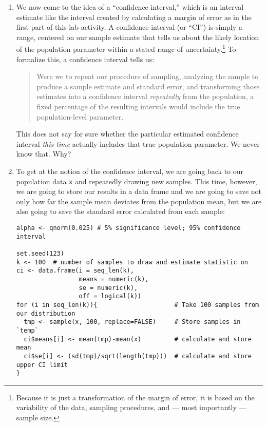\documentclass[a4paper,12pt]{article}
\begin{document}
\begin{enumerate}
\item We now come to the idea of a ``confidence interval,'' which is an interval estimate like the interval created by calculating a margin of error as in the first part of this lab activity. A confidence interval (or ``CI'') is simply a range, centered on our sample estimate that tells us about the likely location of the population parameter within a stated range of uncertainty.\footnote{Because it is just a transformation of the margin of error, it is based on the variability of the data, sampling procedures, and --- most importantly --- sample size.} To formalize this, a confidence interval tells us:

\begin{quote}
Were we to repeat our procedure of sampling, analyzing the sample to produce a sample estimate and standard error, and transforming those estimates into a confidence interval \textit{repeatedly} from the population, a fixed percentage of the resulting intervals would include the true population-level parameter.
\end{quote}
        
\noindent This does not say for sure whether the particular estimated confidence interval \textit{this time} actually includes that true population parameter. We never know that. Why?

\vspace{4em}

\item To get at the notion of the confidence interval, we are going back to our population data \texttt{x} and repeatedly drawing new samples. This time, however, we are going to store our results in a data frame and we are going to save not only how far the sample mean deviates from the population mean, but we are also going to save the standard error calculated from each sample:

\begin{verbatim}
alpha <- qnorm(0.025) # 5% significance level; 95% confidence interval

set.seed(123)
k <- 100  # number of samples to draw and estimate statistic on
ci <- data.frame(i = seq_len(k),
                 means = numeric(k),
                 se = numeric(k),
                 off = logical(k))
for (i in seq_len(k)){                     # Take 100 samples from our distribution
  tmp <- sample(x, 100, replace=FALSE)     # Store samples in `temp`
  ci$means[i] <- mean(tmp)-mean(x)         # calculate and store mean
  ci$se[i] <- (sd(tmp)/sqrt(length(tmp)))  # calculate and store upper CI limit
}
\end{verbatim}


\end{enumerate}
\end{document}
